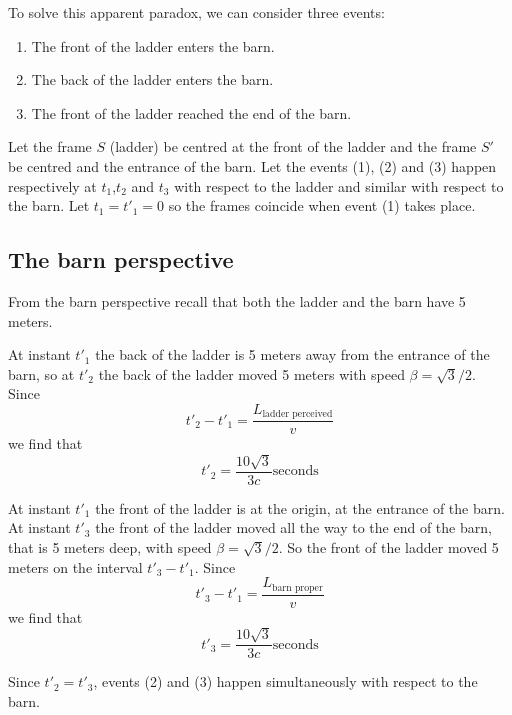 \documentclass[oneside, 10pt, notitlepage]{book}
\begin{document}
To solve this apparent paradox, we can consider three events:
\begin{enumerate}
    \item The front of the ladder enters the barn.
    \item The back of the ladder enters the barn.
    \item The front of the ladder reached the end of the barn.
\end{enumerate}
Let the frame \(S\) (ladder) be centred at the front of the ladder and the frame \(S{\prime}\) be centred and the entrance of the barn. Let the events (1), (2) and (3) happen respectively at \(t_1\),\(t_2\) and \(t_3\) with respect to the ladder and similar with respect to the barn. Let \(t_1=t{\prime}_1=0\) so the frames coincide when event (1) takes place.  

\subsection{The barn perspective}

From the barn perspective recall that both the ladder and the barn have 5 meters.  

At instant \(t{\prime}_1\) the back of the ladder is 5 meters away from the entrance of the barn, so at \(t{\prime}_2\) the back of the ladder moved 5 meters with speed \(\beta = \sqrt{3}/2\). Since
\begin{equation}t{\prime}_2 - t{\prime}_1 = \frac{L_{\text{ladder perceived}}}{v}\end{equation}
we find that
\begin{equation}t{\prime}_2 = \frac{10 \sqrt{3}}{3c} \text{seconds}\end{equation}


At instant \(t{\prime}_1\) the front of the ladder is at the origin, at the entrance of the barn. At instant \(t{\prime}_3\) the front of the ladder moved all the way to the end of the barn, that is 5 meters deep, with speed \(\beta = \sqrt{3}/2\). So the front of the ladder moved 5 meters on the interval \(t{\prime}_3 - t{\prime}_1\). Since
\begin{equation}t{\prime}_3 -t{\prime}_1 = \frac{L_{\text{barn proper}}}{v} \end{equation}
we find that
\begin{equation}t{\prime}_3 = \frac{10 \sqrt{3}}{3c} \text{seconds}\end{equation}


Since \(t{\prime}_2 = t{\prime}_3\), events (2) and (3) happen simultaneously with respect to the barn.
\end{document}
